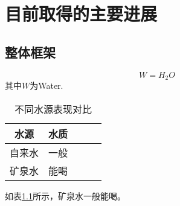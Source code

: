 \chapter{目前取得的主要进展}


\section{整体框架}


\begin{equation} 
    W = H_2O
\end{equation}
其中$W$为Water.


\begin{table}[ht]
    \caption{不同水源表现对比}
    \centering
    \begin{tabular}{ccccc}
    \toprule
    \textbf{水源} & \textbf{水质} \\
    \midrule
    自来水 & 一般 \\
    矿泉水 & 能喝 \\
    \bottomrule
    \end{tabular}
    \label{tab:water}
\end{table}

如表\ref{tab:water}所示，矿泉水一般能喝。